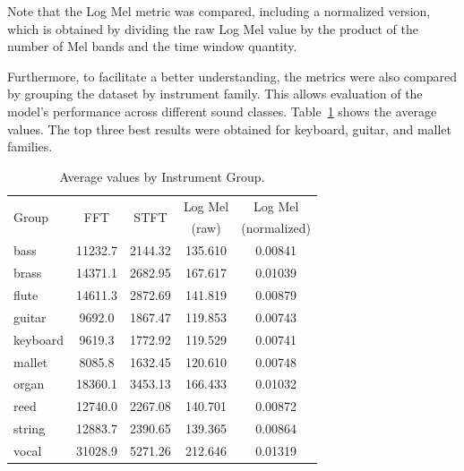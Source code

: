 \documentclass[10pt,conference]{IEEEtran}
\newcommand{\basg}[1]{{\color{blue}[#1]}}
\begin{document}
Note that the Log Mel metric was compared, including a normalized version, which is obtained by dividing the raw Log Mel value by the product of the number of Mel bands and the time window quantity.



Furthermore, to facilitate a better understanding, the metrics were also compared by grouping the dataset by instrument family. This allows evaluation of the model's performance across different sound classes. Table~\ref{tab:avg_metrics_groups} shows the average values.
The top three best results were obtained for keyboard, guitar, and mallet families.



\begin{table}[htb] \small
  \caption{Average values by Instrument Group.}
  \label{tab:avg_metrics_groups}
  \begin{tabular*}{\columnwidth}
	{@{\extracolsep{\fill}}lcccc}
    \toprule
    \multirow{2}{*}{Group} & \multirow{2}{*}{FFT} & \multirow{2}{*}{STFT} & Log Mel& Log Mel \\
    &   &   &   (raw)  & (normalized) \\
    \midrule
    bass     & 11232.7 & 2144.32 & 135.610 & 0.00841 \\
    brass    & 14371.1 & 2682.95 & 167.617 & 0.01039 \\
    flute    & 14611.3 & 2872.69 & 141.819 & 0.00879 \\
    guitar   & 9692.0  & 1867.47 & 119.853 & 0.00743 \\
    keyboard & 9619.3  & 1772.92 & 119.529 & 0.00741 \\
    mallet   & 8085.8  & 1632.45 & 120.610 & 0.00748 \\
    organ    & 18360.1 & 3453.13 & 166.433 & 0.01032 \\
    reed     & 12740.0 & 2267.08 & 140.701 & 0.00872 \\
    string   & 12883.7 & 2390.65 & 139.365 & 0.00864 \\
    vocal    & 31028.9 & 5271.26 & 212.646 & 0.01319 \\
    \bottomrule
  \end{tabular*}
\end{table}
\end{document}
